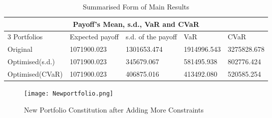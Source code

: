 \begin{table}[t!]
\centering
\caption{Summarised Form of Main Results}
\begin{tabular}{ |p{3.1cm}||p{2cm}|p{2cm}|p{2cm}|p{2cm}| }
 \hline
 \multicolumn{5}{|c|}{Payoff's Mean, s.d., VaR and CVaR} \\
 \hline
3 Portfolios& Expected payoff&s.d. of the payoff&VaR&CVaR\\
 \hline
Original& 1071900.023&1301653.474&1914996.543&3275828.678\\
Optimised(s.d.)&1071900.023&345679.067&581495.938&802776.424\\
Optimised(CVaR)&1071900.023&406875.016&413492.080&520585.254\\
 \hline
\end{tabular}
\end{table}
\begin{figure}[t!]
  \centering
  \texttt{[image: Newportfolio.png]}
  \caption{New Portfolio Constitution after Adding More Constraints \label{fig:scaled_diss}}
\end{figure}






